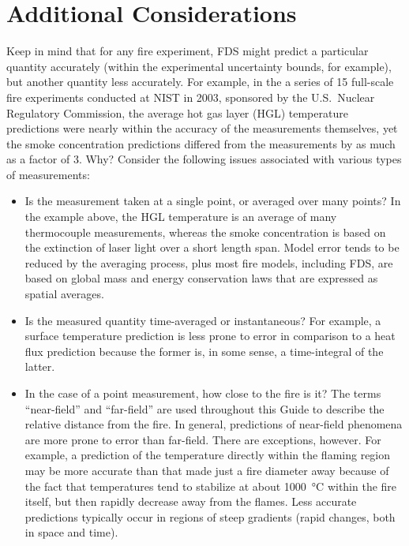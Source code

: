 \section{Additional Considerations}


Keep in mind that for any fire experiment, FDS might predict a particular quantity accurately (within the experimental uncertainty bounds, for
example), but another quantity less accurately. For example, in the a series of 15 full-scale fire experiments conducted at NIST in 2003, sponsored
by the U.S.~Nuclear Regulatory Commission, the average hot gas layer (HGL) temperature predictions were nearly within the accuracy of the measurements
themselves, yet the smoke concentration predictions differed from the measurements by as much as a factor of 3. Why? Consider the following issues
associated with various types of measurements:
\begin{itemize}
\item Is the measurement taken at a single point, or averaged over many points? In the example above, the HGL temperature is an average of many
thermocouple measurements, whereas the smoke concentration is based on the extinction of laser light over a short length span. Model error tends to
be reduced by the averaging process, plus most fire models, including FDS, are based on global mass and energy conservation laws that are expressed
as spatial averages.
\item Is the measured quantity time-averaged or instantaneous? For example, a surface temperature prediction is less prone to error in comparison to a
heat flux prediction because the former is, in some sense, a time-integral of the latter.
\item In the case of a point measurement, how close to the fire is it? The terms ``near-field'' and ``far-field'' are used throughout this Guide to describe
the relative distance from the fire. In general, predictions of near-field phenomena are more prone to error than far-field. There are exceptions,
however. For example, a prediction of the temperature directly within the flaming region may be more accurate than that made just a fire diameter
away because of the fact that temperatures tend to stabilize at about 1000~\unit{\degreeCelsius} within the fire itself, but then rapidly decrease away from the
flames. Less accurate predictions typically occur in regions of steep gradients (rapid changes, both in space and time).
\end{itemize}



